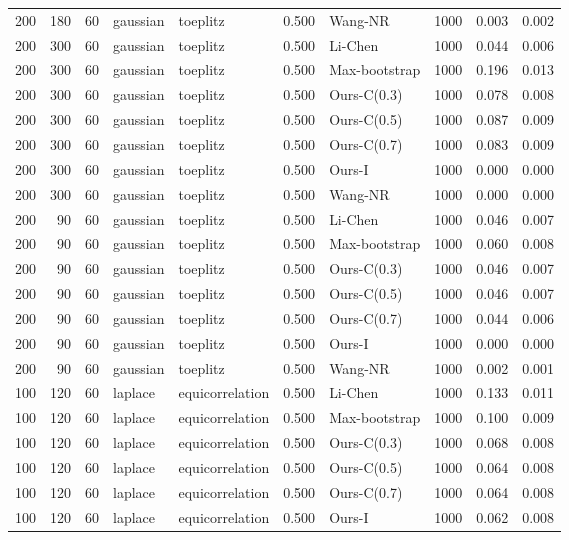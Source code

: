 \begin{tabular}{rrrllrlrrr}
200 & 180 & 60 & gaussian & toeplitz & 0.500 & Wang-NR & 1000 & 0.003 & 0.002 \\
200 & 300 & 60 & gaussian & toeplitz & 0.500 & Li-Chen & 1000 & 0.044 & 0.006 \\
200 & 300 & 60 & gaussian & toeplitz & 0.500 & Max-bootstrap & 1000 & 0.196 & 0.013 \\
200 & 300 & 60 & gaussian & toeplitz & 0.500 & Ours-C(0.3) & 1000 & 0.078 & 0.008 \\
200 & 300 & 60 & gaussian & toeplitz & 0.500 & Ours-C(0.5) & 1000 & 0.087 & 0.009 \\
200 & 300 & 60 & gaussian & toeplitz & 0.500 & Ours-C(0.7) & 1000 & 0.083 & 0.009 \\
200 & 300 & 60 & gaussian & toeplitz & 0.500 & Ours-I & 1000 & 0.000 & 0.000 \\
200 & 300 & 60 & gaussian & toeplitz & 0.500 & Wang-NR & 1000 & 0.000 & 0.000 \\
200 & 90 & 60 & gaussian & toeplitz & 0.500 & Li-Chen & 1000 & 0.046 & 0.007 \\
200 & 90 & 60 & gaussian & toeplitz & 0.500 & Max-bootstrap & 1000 & 0.060 & 0.008 \\
200 & 90 & 60 & gaussian & toeplitz & 0.500 & Ours-C(0.3) & 1000 & 0.046 & 0.007 \\
200 & 90 & 60 & gaussian & toeplitz & 0.500 & Ours-C(0.5) & 1000 & 0.046 & 0.007 \\
200 & 90 & 60 & gaussian & toeplitz & 0.500 & Ours-C(0.7) & 1000 & 0.044 & 0.006 \\
200 & 90 & 60 & gaussian & toeplitz & 0.500 & Ours-I & 1000 & 0.000 & 0.000 \\
200 & 90 & 60 & gaussian & toeplitz & 0.500 & Wang-NR & 1000 & 0.002 & 0.001 \\
100 & 120 & 60 & laplace & equicorrelation & 0.500 & Li-Chen & 1000 & 0.133 & 0.011 \\
100 & 120 & 60 & laplace & equicorrelation & 0.500 & Max-bootstrap & 1000 & 0.100 & 0.009 \\
100 & 120 & 60 & laplace & equicorrelation & 0.500 & Ours-C(0.3) & 1000 & 0.068 & 0.008 \\
100 & 120 & 60 & laplace & equicorrelation & 0.500 & Ours-C(0.5) & 1000 & 0.064 & 0.008 \\
100 & 120 & 60 & laplace & equicorrelation & 0.500 & Ours-C(0.7) & 1000 & 0.064 & 0.008 \\
100 & 120 & 60 & laplace & equicorrelation & 0.500 & Ours-I & 1000 & 0.062 & 0.008 \\

\end{tabular}
